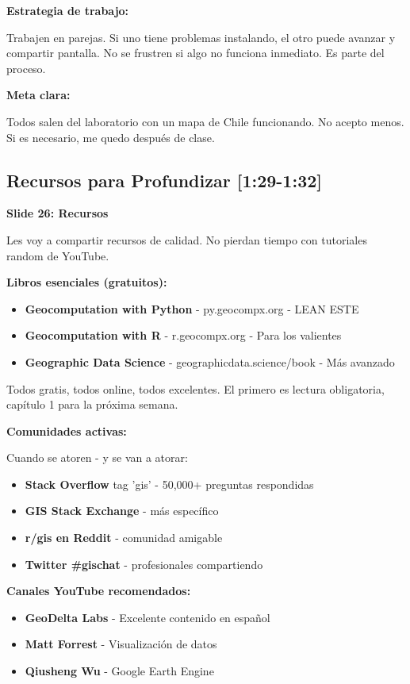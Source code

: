 \documentclass[11pt,a4paper]{article}
\newcommand{\tiempo}[1]{\textcolor{timecolor}{\faIcon{clock} \textbf{[#1]}}}
\newcommand{\decir}[1]{\begin{tcolorbox}[colback=blue!5,colframe=usachblue,title={\faIcon{microphone} DECIR}]#1\end{tcolorbox}}
\begin{document}
\textbf{Estrategia de trabajo:}

\decir{Trabajen en parejas. Si uno tiene problemas instalando, el otro puede avanzar y compartir pantalla. No se frustren si algo no funciona inmediato. Es parte del proceso.}

\textbf{Meta clara:}

\decir{Todos salen del laboratorio con un mapa de Chile funcionando. No acepto menos. Si es necesario, me quedo después de clase.}

\subsection{Recursos para Profundizar \tiempo{1:29-1:32}}

\textbf{Slide 26: Recursos}

\decir{Les voy a compartir recursos de calidad. No pierdan tiempo con tutoriales random de YouTube.}

\textbf{Libros esenciales (gratuitos):}

\decir{
\begin{itemize}
    \item \textbf{Geocomputation with Python} - py.geocompx.org - LEAN ESTE
    \item \textbf{Geocomputation with R} - r.geocompx.org - Para los valientes
    \item \textbf{Geographic Data Science} - geographicdata.science/book - Más avanzado
\end{itemize}

Todos gratis, todos online, todos excelentes. El primero es lectura obligatoria, capítulo 1 para la próxima semana.}

\textbf{Comunidades activas:}

\decir{
Cuando se atoren - y se van a atorar:
\begin{itemize}
    \item \textbf{Stack Overflow} tag 'gis' - 50,000+ preguntas respondidas
    \item \textbf{GIS Stack Exchange} - más específico
    \item \textbf{r/gis en Reddit} - comunidad amigable
    \item \textbf{Twitter \#gischat} - profesionales compartiendo
\end{itemize}
}

\textbf{Canales YouTube recomendados:}

\decir{
\begin{itemize}
    \item \textbf{GeoDelta Labs} - Excelente contenido en español
    \item \textbf{Matt Forrest} - Visualización de datos
    \item \textbf{Qiusheng Wu} - Google Earth Engine
\end{itemize}
}
\end{document}
